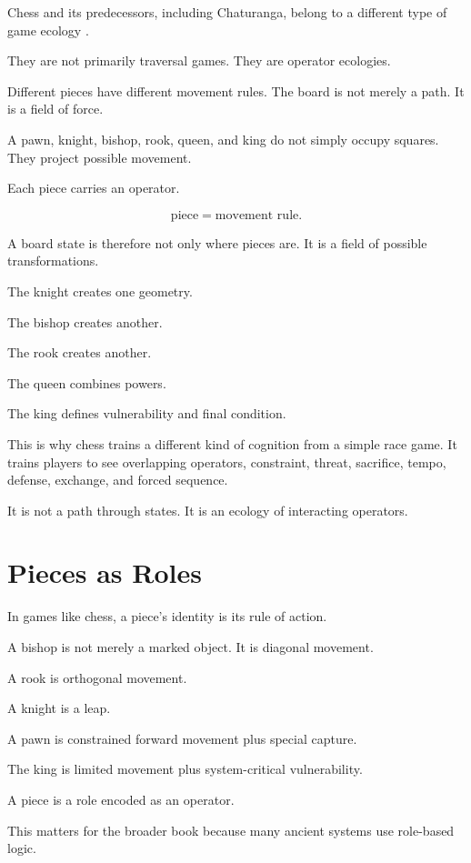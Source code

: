 \documentclass[11pt]{book}
\begin{document}
Chess and its predecessors, including Chaturanga, belong to a different type of game ecology \cite{Murray1913Chess,Murray1952BoardGames}.

They are not primarily traversal games. They are operator ecologies.

Different pieces have different movement rules. The board is not merely a path. It is a field of force.

A pawn, knight, bishop, rook, queen, and king do not simply occupy squares. They project possible movement.

Each piece carries an operator.

\[
\text{piece} = \text{movement rule}.
\]

A board state is therefore not only where pieces are. It is a field of possible transformations.

The knight creates one geometry.

The bishop creates another.

The rook creates another.

The queen combines powers.

The king defines vulnerability and final condition.

This is why chess trains a different kind of cognition from a simple race game. It trains players to see overlapping operators, constraint, threat, sacrifice, tempo, defense, exchange, and forced sequence.

It is not a path through states. It is an ecology of interacting operators.

\section{Pieces as Roles}

In games like chess, a piece's identity is its rule of action.

A bishop is not merely a marked object. It is diagonal movement.

A rook is orthogonal movement.

A knight is a leap.

A pawn is constrained forward movement plus special capture.

The king is limited movement plus system-critical vulnerability.

A piece is a role encoded as an operator.

This matters for the broader book because many ancient systems use role-based logic.
\end{document}
